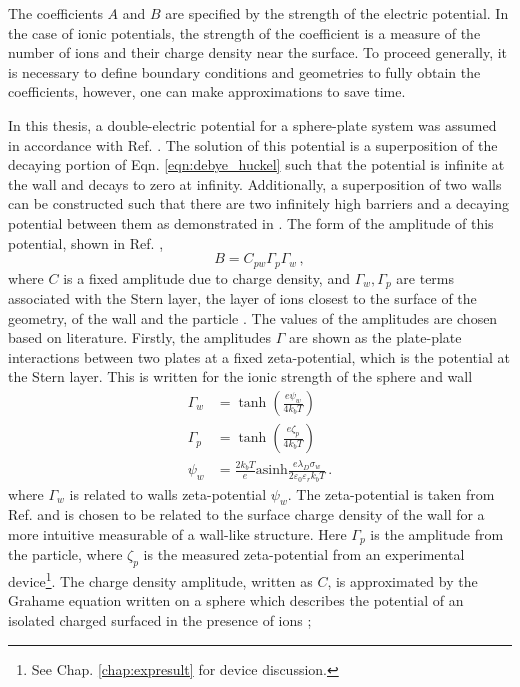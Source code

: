 The coefficients $A$ and $B$ are specified by the strength of the electric potential. In the case of ionic potentials, the strength of the coefficient is a measure of the number of ions and their charge density near the surface. To proceed generally, it is necessary to define boundary conditions and geometries to fully obtain the coefficients, however, one can make approximations to save time. 

In this thesis, a double-electric potential for a sphere-plate system was assumed in accordance with Ref. \cite{lin_exact_2010}. The solution of this potential is a superposition of the decaying portion of Eqn. \ref{eqn:debye_huckel} such that the potential is infinite at the wall and decays to zero at infinity. Additionally, a superposition of two walls can be constructed such that there are two infinitely high barriers and a decaying potential between them as demonstrated in \cite{millanNumericalSimulationsConfined2023}. The form of the amplitude of this potential, shown in Ref. \cite{lin_exact_2010}, 
\begin{equation}
    B = C_{pw} \Gamma_p \Gamma_w\,,
\end{equation}
where  $C$ is a fixed amplitude due to charge density, and $\Gamma_w, \Gamma_p$ are terms associated with the Stern layer, the layer of ions closest to the surface of the geometry, of the wall and the particle \cite{lin_exact_2010, israelachviliIntermolecularSurfaceForces}. The values of the amplitudes are chosen based on literature. Firstly, the amplitudes $\Gamma$ are shown as the plate-plate interactions between two plates at a fixed zeta-potential, which is the potential at the Stern layer. This is written for the ionic strength of the sphere and wall 
\begin{equation}\label{eqn:amp1}
    \begin{aligned}
        \Gamma_w &= \tanh\left(\frac{e \psi_w}{4k_b T}\right)\\
        \Gamma_p &= \tanh\left(\frac{e \zeta_p}{4k_b T}\right)\\
        \psi_w & = \frac{2 k_b T}{e} \text{asinh}\frac{e\lambda_D \sigma_w}{2 \varepsilon_0 \varepsilon_r k_b T}\,.
    \end{aligned}
\end{equation}
where $\Gamma_w$ is related to walls zeta-potential $\psi_w$. The zeta-potential is taken from Ref. \cite{israelachviliIntermolecularSurfaceForces} and is chosen to be related to the surface charge density of the wall for a more intuitive measurable of a wall-like structure. Here $\Gamma_p$ is the amplitude from the particle, where $\zeta_p$ is the measured zeta-potential from an experimental device\footnote{See Chap. \ref{chap:expresult} for device discussion.}. The charge density amplitude, written as $C$, is approximated by the Grahame equation written on a sphere which describes the potential of an isolated charged surfaced in the presence of ions \cite{israelachviliIntermolecularSurfaceForces};

